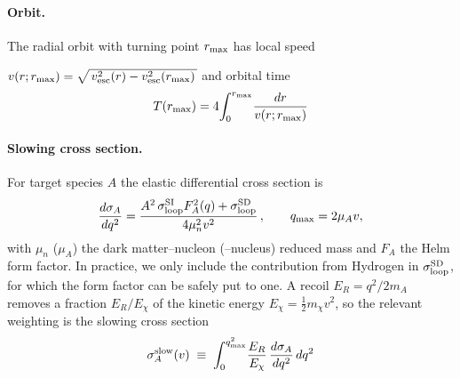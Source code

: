 \documentclass[prl,reprint,superscriptaddress]{revtex4-2}
\newcommand{\rmax}{r_{\rm max}}
\begin{document}
\paragraph{Orbit.}
The radial orbit with turning point $\rmax$ has local speed

 $ v(r;\rmax)=\sqrt{\,v_{\rm esc}^2(r)-v_{\rm esc}^2(\rmax)\,}$ and orbital time 
 \begin{align}
  T(\rmax)=4\!\int_0^{\rmax}\!\frac{dr}{v(r;\rmax)}
  \end{align}
%

\paragraph{Slowing cross section.}
For target species $A$ the elastic differential cross section is
%
\begin{equation}
  \frac{d\sigma_A}{dq^2}
  = \frac{A^2\,\sigma^{\rm SI}_{\rm loop}F_A^2(q)+\sigma^{\rm SD}_{\rm loop}}{4\mu_n^2 v^2}\,,
  \qquad
  q_{\max}=2\mu_A v ,
  \label{eq:dsdq2}
\end{equation}
%
with $\mu_n$ ($\mu_A$) the dark matter--nucleon (--nucleus) reduced mass and
$F_A$ the Helm form factor.  In practice, we only include the contribution from Hydrogen in $\sigma_{\rm loop}^{\rm SD}$, for which the form factor can be safely put to one. A recoil $E_R=q^2/2m_A$ removes a fraction
$E_R/E_\chi$ of the kinetic energy $E_\chi=\tfrac12 m_\chi v^2$, so the
relevant weighting is the slowing cross section
%
\begin{equation}
  \sigma^{\rm slow}_A(v)
  \;\equiv\;\int_0^{q^2_{\max}}\!\frac{E_R}{E_\chi}\,
      \frac{d\sigma_A}{dq^2}\,dq^2
  \label{eq:sigslow}
\end{equation}
%

%
%
\end{document}
